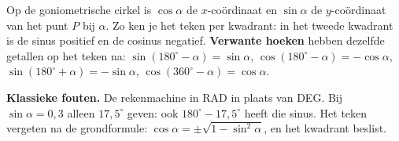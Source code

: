 Op de goniometrische cirkel is $\cos\alpha$ de $x$-coördinaat en $\sin\alpha$ de $y$-coördinaat van het punt $P$ bij $\alpha$. Zo ken je het teken per kwadrant: in het tweede kwadrant is de sinus positief en de cosinus negatief. \textbf{Verwante hoeken} hebben dezelfde getallen op het teken na: $\sin(180^\circ - \alpha) = \sin\alpha$, $\cos(180^\circ - \alpha) = -\cos\alpha$, $\sin(180^\circ + \alpha) = -\sin\alpha$, $\cos(360^\circ - \alpha) = \cos\alpha$.

\textbf{Klassieke fouten.} De rekenmachine in RAD in plaats van DEG. Bij $\sin\alpha = 0{,}3$ alleen $17{,}5^\circ$ geven: ook $180^\circ - 17{,}5^\circ$ heeft die sinus. Het teken vergeten na de grondformule: $\cos\alpha = \pm\sqrt{1 - \sin^2\alpha}$, en het kwadrant beslist.


\opdrachtenkop

\begin{oefeningen}









\end{oefeningen}


